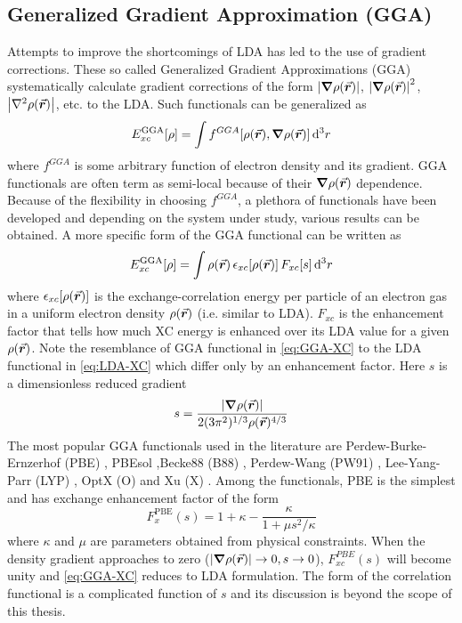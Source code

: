 \subsection{Generalized Gradient Approximation (GGA)}
Attempts to improve the shortcomings of LDA has led to the  use of gradient corrections. These so called Generalized Gradient Approximations (GGA) systematically calculate gradient corrections of the form $\abs{\grad \rho({\va*{r}})}$, $\abs{\grad \rho({\va*{r}})}^2$, $\abs{\laplacian\rho({\va*{r}})}$, etc. to the LDA. Such functionals can be generalized as
\begin{equation}\label{eq:GGA_xc}
	E^{\text{GGA}}_{xc} [\rho]= \int f^{GGA}[\rho({\va*{r}}),\grad \rho({\va*{r}})] \dd[3]{r}
\end{equation}
where $f^{GGA}$ is some arbitrary function of electron  density and its gradient. GGA functionals are often term as semi-local because of their $\grad \rho({\va*{r}})$ dependence. Because of the flexibility in choosing $f^{GGA}$, a plethora of functionals have been developed and depending on the system under study, various results can be obtained. A more specific form of the GGA functional can be written as \citep{Csonka2009}
\begin{equation} \label{eq:GGA-XC}
	E^{\text{GGA}}_{xc} [\rho]= \int \rho({\va*{r}})\, \epsilon_{xc}[\rho({\va*{r}})]\, F_{xc}[s]  \dd[3]{r}
\end{equation}
where $\epsilon_{xc}[\rho({\va*{r}})]$ is the exchange-correlation energy per particle of an electron gas in a uniform electron density $\rho({\va*{r}})$ (i.e. similar to LDA). $F_{xc}$ is the enhancement factor that tells how much XC energy is enhanced over its LDA value for a given  $\rho({\va*{r}})$. Note the resemblance of GGA functional in \eqref{eq:GGA-XC} to the LDA functional in \eqref{eq:LDA-XC} which differ only by an enhancement factor. Here $s$ is a dimensionless reduced gradient
\begin{equation}
	s = \frac{\abs{\grad \rho({\va*{r}})}}{2 (3\pi^2)^{1/3} \rho({\va*{r}})^{4/3}}
\end{equation}
The most popular GGA functionals used in the literature are Perdew-Burke-Ernzerhof (PBE) \citep{Perdew1996}, PBEsol \citep{Perdew2008},Becke88 (B88) \citep{Becke1988},  Perdew-Wang (PW91) \citep{Perdew1992}, Lee-Yang-Parr (LYP) \citep{Lee1988}, OptX (O) \citep{Handy2001} and Xu (X) \citep{Xu2004}. Among the functionals, PBE is the  simplest and has  exchange enhancement factor of the form
\begin{equation} \label{eq:F_x}
	F_{x}^{\text{PBE}}(s) = 1 + \kappa  - \frac{\kappa}{1+\mu s^2/\kappa}
\end{equation}
where $\kappa$ and $\mu$ are parameters obtained from physical constraints. When the density gradient approaches to zero ($\abs{\grad \rho({\va*{r}})} \rightarrow 0,s \rightarrow 0$), $F_{xc}^{PBE}(s)$ will become unity and \eqref{eq:GGA-XC} reduces to LDA formulation. The form of the  correlation functional is a complicated function of $s$ and its discussion is beyond the scope of this thesis.

